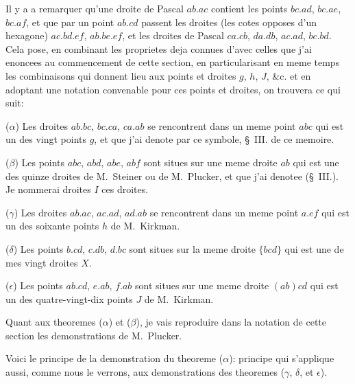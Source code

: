 \documentclass[12pt,a4paper]{article}
\begin{document}
Il y a a remarquer qu'une droite de Pascal $ab.ac$ contient les points $bc.ad$, $bc.ae$, $bc.af$, et que par un point $ab.cd$ passent les droites (les cotes opposes d'un hexagone) $ac.bd.ef$, $ab.be.ef$, et les droites de Pascal $ca.cb$, $da.db$, $ac.ad$, $bc.bd$. Cela pose, en combinant les proprietes deja connues d'avec celles que j'ai enoncees au commencement de cette section, en particularisant en meme temps les combinaisons qui donnent lieu aux points et droites $g$, $h$, $J$, \&c. et en adoptant une notation convenable pour ces points et droites, on trouvera ce qui suit:

($\alpha$) Les droites $ab.bc$, $bc.ca$, $ca.ab$ se rencontrent dans un meme point $abc$ qui est un des vingt points $g$, et que j'ai denote par ce symbole, \S~III. de ce memoire.

($\beta$) Les points $abc$, $abd$, $abe$, $abf$ sont situes sur une meme droite $ab$ qui est une des quinze droites de M.~Steiner ou de M.~Plucker, et que j'ai denotee (\S~III.). Je nommerai droites $I$ ces droites.

($\gamma$) Les droites $ab.ac$, $ac.ad$, $ad.ab$ se rencontrent dans un meme point $a.ef$ qui est un des soixante points $h$ de M.~Kirkman.

($\delta$) Les points $b.cd$, $c.db$, $d.bc$ sont situes sur la meme droite $\{bcd\}$ qui est une de mes vingt droites $X$.

($\epsilon$) Les points $ab.cd$, $e.ab$, $f.ab$ sont situes sur une meme droite $(ab)cd$ qui est un des quatre-vingt-dix points $J$ de M.~Kirkman.

Quant aux theoremes ($\alpha$) et ($\beta$), je vais reproduire dans la notation de cette section les demonstrations de M.~Plucker.

Voici le principe de la demonstration du theoreme ($\alpha$): principe qui s'applique aussi, comme nous le verrons, aux demonstrations des theoremes ($\gamma$, $\delta$, et $\epsilon$).
\end{document}

